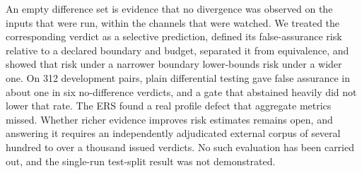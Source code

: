 \documentclass{ieeeaccess}
\begin{document}
\label{sec:conclusion}
An empty difference set is evidence that no divergence was observed on the inputs that were run, within the channels that were watched. We treated the corresponding verdict as a selective prediction, defined its false-assurance risk relative to a declared boundary and budget, separated it from equivalence, and showed that risk under a narrower boundary lower-bounds risk under a wider one. On 312 development pairs, plain differential testing gave false assurance in about one in six no-difference verdicts, and a gate that abstained heavily did not lower that rate. The ERS found a real profile defect that aggregate metrics missed. Whether richer evidence improves risk estimates remains open, and answering it requires an independently adjudicated external corpus of several hundred to over a thousand issued verdicts. No such evaluation has been carried out, and the single-run test-split result was not demonstrated.





\EOD
\end{document}
